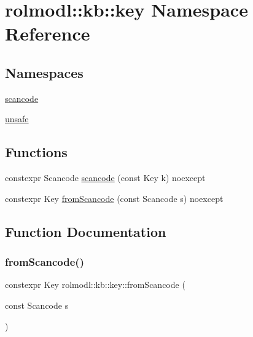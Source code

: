\hypertarget{namespacerolmodl_1_1kb_1_1key}{}\section{rolmodl\+::kb\+::key Namespace Reference}
\label{namespacerolmodl_1_1kb_1_1key}
\subsection*{Namespaces}
\begin{DoxyCompactItemize}
\item 
 \mbox{\hyperlink{namespacerolmodl_1_1kb_1_1key_1_1scancode}{scancode}}
\item 
 \mbox{\hyperlink{namespacerolmodl_1_1kb_1_1key_1_1unsafe}{unsafe}}
\end{DoxyCompactItemize}
\subsection*{Functions}
\begin{DoxyCompactItemize}
\item 
constexpr Scancode \mbox{\hyperlink{namespacerolmodl_1_1kb_1_1key_a0c5dea49f4ae2ad1371b4c47e3afd8fb}{scancode}} (const Key k) noexcept
\item 
constexpr Key \mbox{\hyperlink{namespacerolmodl_1_1kb_1_1key_a3a268593f58efe146638aa980183d928}{from\+Scancode}} (const Scancode s) noexcept
\end{DoxyCompactItemize}


\subsection{Function Documentation}
\mbox{\label{namespacerolmodl_1_1kb_1_1key_a3a268593f58efe146638aa980183d928}} 
\subsubsection{\texorpdfstring{fromScancode()}{fromScancode()}}
{\footnotesize\ttfamily constexpr Key rolmodl\+::kb\+::key\+::from\+Scancode (\begin{DoxyParamCaption}\item[{const Scancode}]{s }\end{DoxyParamCaption})\hspace{0.3cm}{\ttfamily [noexcept]}}

